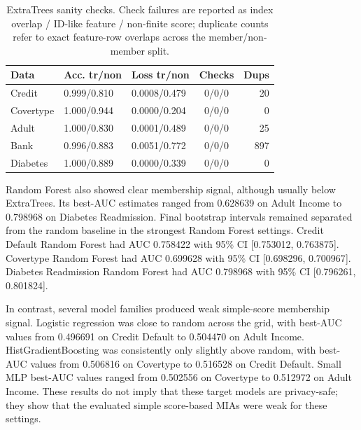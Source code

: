 \documentclass[
  10pt,
  twocolumn]{article}
\begin{document}
\begin{table}[H]
\centering
\scriptsize
\setlength{\tabcolsep}{2.4pt}
\caption{ExtraTrees sanity checks. Check failures are reported as index overlap / ID-like feature / non-finite score; duplicate counts refer to exact feature-row overlaps across the member/non-member split.}
\label{tab:extratrees-sanity}
\begin{tabularx}{\columnwidth}{@{}l Y Y c r@{}}
\toprule
Data & Acc. tr/non & Loss tr/non & Checks & Dups \\
\midrule
Credit & 0.999/0.810 & 0.0008/0.479 & 0/0/0 & 20 \\
Covertype & 1.000/0.944 & 0.0000/0.204 & 0/0/0 & 0 \\
Adult & 1.000/0.830 & 0.0001/0.489 & 0/0/0 & 25 \\
Bank & 0.996/0.883 & 0.0051/0.772 & 0/0/0 & 897 \\
Diabetes & 1.000/0.889 & 0.0000/0.339 & 0/0/0 & 0 \\
\bottomrule
\end{tabularx}
\end{table}

Random Forest also showed clear membership signal, although usually below ExtraTrees. Its best-AUC estimates ranged from 0.628639 on Adult Income to 0.798968 on Diabetes Readmission. Final bootstrap intervals remained separated from the random baseline in the strongest Random Forest settings. Credit Default Random Forest had AUC 0.758422 with 95\% CI {[}0.753012, 0.763875{]}. Covertype Random Forest had AUC 0.699628 with 95\% CI {[}0.698296, 0.700967{]}. Diabetes Readmission Random Forest had AUC 0.798968 with 95\% CI {[}0.796261, 0.801824{]}.

In contrast, several model families produced weak simple-score membership signal. Logistic regression was close to random across the grid, with best-AUC values from 0.496691 on Credit Default to 0.504470 on Adult Income. HistGradientBoosting was consistently only slightly above random, with best-AUC values from 0.506816 on Covertype to 0.516528 on Credit Default. Small MLP best-AUC values ranged from 0.502556 on Covertype to 0.512972 on Adult Income. These results do not imply that these target models are privacy-safe; they show that the evaluated simple score-based MIAs were weak for these settings.
\end{document}
